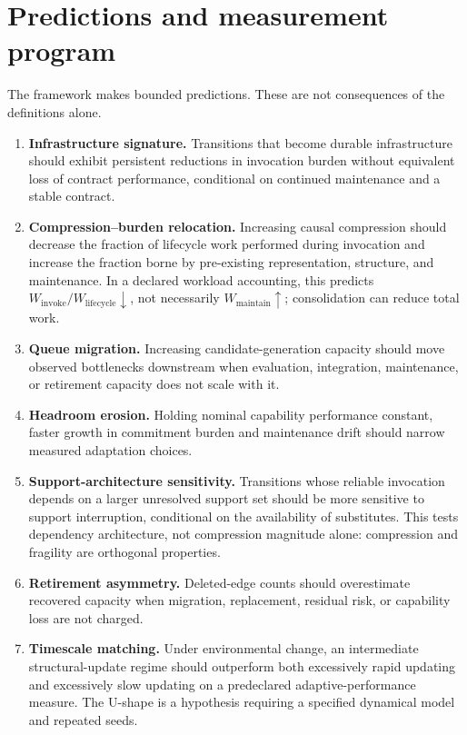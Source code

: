 \documentclass[11pt]{article}
\begin{document}
\section{Predictions and measurement program}

The framework makes bounded predictions. These are not consequences of the definitions alone.

\begin{enumerate}[leftmargin=*]
\item \textbf{Infrastructure signature.} Transitions that become durable infrastructure should exhibit persistent reductions in invocation burden without equivalent loss of contract performance, conditional on continued maintenance and a stable contract.
\item \textbf{Compression--burden relocation.} Increasing causal compression should decrease the fraction of lifecycle work performed during invocation and increase the fraction borne by pre-existing representation, structure, and maintenance. In a declared workload accounting, this predicts \(W_{\mathrm{invoke}}/W_{\mathrm{lifecycle}}\downarrow\), not necessarily \(W_{\mathrm{maintain}}\uparrow\); consolidation can reduce total work.
\item \textbf{Queue migration.} Increasing candidate-generation capacity should move observed bottlenecks downstream when evaluation, integration, maintenance, or retirement capacity does not scale with it.
\item \textbf{Headroom erosion.} Holding nominal capability performance constant, faster growth in commitment burden and maintenance drift should narrow measured adaptation choices.
\item \textbf{Support-architecture sensitivity.} Transitions whose reliable invocation depends on a larger unresolved support set should be more sensitive to support interruption, conditional on the availability of substitutes. This tests dependency architecture, not compression magnitude alone: compression and fragility are orthogonal properties.
\item \textbf{Retirement asymmetry.} Deleted-edge counts should overestimate recovered capacity when migration, replacement, residual risk, or capability loss are not charged.
\item \textbf{Timescale matching.} Under environmental change, an intermediate structural-update regime should outperform both excessively rapid updating and excessively slow updating on a predeclared adaptive-performance measure. The U-shape is a hypothesis requiring a specified dynamical model and repeated seeds.
\end{enumerate}
\end{document}
